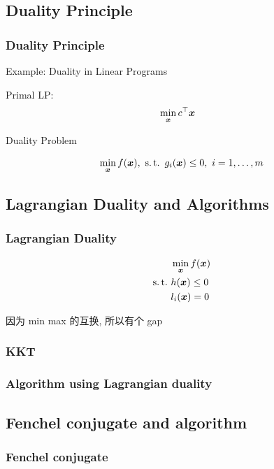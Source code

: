 \subsection{Duality Principle}

\subsubsection{Duality Principle}

Example: Duality in Linear Programs

Primal LP:
\begin{align*}
    & \min_{\bm{x}} c^\top \bm{x}
\end{align*}


Duality Problem

\begin{align*}
    \min_{\bx}f(\bx),\ \st g_i(\bx)\le 0,\ i=1,\dots,m
\end{align*}

\subsection{Lagrangian Duality and Algorithms}

\subsubsection{Lagrangian Duality}
\begin{align*}
    &\min_{\bx}f(\bx)\\
    \st&h(\bx)\le 0\\
    &l_i(\bx)=0
\end{align*}

因为 min max 的互换, 所以有个 gap


\subsubsection{KKT}

\subsubsection{Algorithm using Lagrangian duality}

\subsection{Fenchel conjugate and algorithm}

\subsubsection{Fenchel conjugate}

